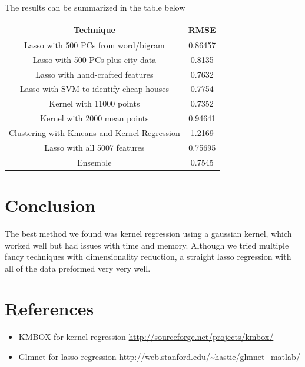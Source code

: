 \documentclass[a4paper,10pt]{article}
\begin{document}
The results can be summarized in the table below
\begin{center}
\begin{tabular}{|c | c|}
\hline
 Technique & RMSE \\ \hline
Lasso with 500 PCs from word/bigram & 0.86457 \\ \hline
Lasso with 500 PCs plus city data & 0.8135 \\ \hline
Lasso with hand-crafted features & 0.7632 \\ \hline
Lasso with SVM to identify cheap houses & 0.7754 \\ \hline
Kernel with 11000 points & 0.7352 \\ \hline
Kernel with 2000 mean points & 0.94641 \\ \hline
Clustering with Kmeans and Kernel Regression & 1.2169\\ \hline
Lasso with all 5007 features & 0.75695 \\ \hline
Ensemble & 0.7545 \\ \hline
\end{tabular}
\end{center}

\section{Conclusion}
The best method we found was kernel regression using a gaussian kernel, which worked well but had issues with time and memory. Although we tried multiple fancy techniques with dimensionality reduction, a straight lasso regression with all of the data preformed very very well.

\section*{References}
\begin{itemize}
 \item KMBOX for kernel regression \url{http://sourceforge.net/projects/kmbox/}
 \item Glmnet for lasso regression \url{http://web.stanford.edu/~hastie/glmnet_matlab/}
\end{itemize}
\end{document}
